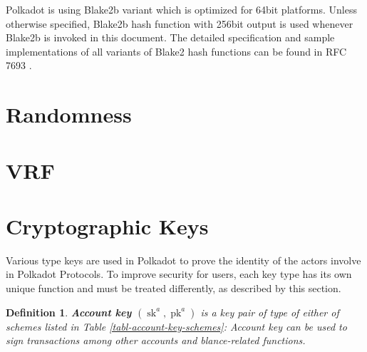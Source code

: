 \documentclass{book}
\newcommand{\tmop}[1]{\ensuremath{\operatorname{#1}}}
\newcommand{\tmstrong}[1]{\textbf{#1}}
\newcommand{\tmtextbf}[1]{{\bfseries{#1}}}
\newtheorem{definition}{Definition}
\providecommand{\tmop}[1]{\ensuremath{\mathrm{#1}}}
\providecommand{\tmstrong}[1]{\tmtextbf{#1}}
\providecommand{\tmtextbf}[1]{\tmtextbf{#1}}
\newtheorem{definition}{Definition}
\begin{document}
Polkadot is using Blake2b variant which is optimized for 64bit platforms.
Unless otherwise specified, Blake2b hash function with 256bit output is used
whenever Blake2b is invoked in this document. The detailed specification and
sample implementations of all variants of Blake2 hash functions can be found
in RFC 7693 {\cite{saarinen_blake2_2015}}.

\section{Randomness}\label{sect-randomness}

\section{VRF}\label{sect-vrf}

\section{Cryptographic Keys}\label{sect-cryptographic-keys}

Various type keys are used in Polkadot to prove the identity of the actors
involve in Polkadot Protocols. To improve security for users, each key type
has its own unique function and must be treated differently, as described by
this section.

\begin{definition}
  \label{defn-account-key}{\tmstrong{Account key $(\tmop{sk}^a,
  \tmop{pk}^a)$}} is a key pair of type of either of schemes listed in Table
  \ref{tabl-account-key-schemes}:
  {}
  Account key can be used to sign transactions among other accounts and
  blance-related functions.
\end{definition}
\end{document}
